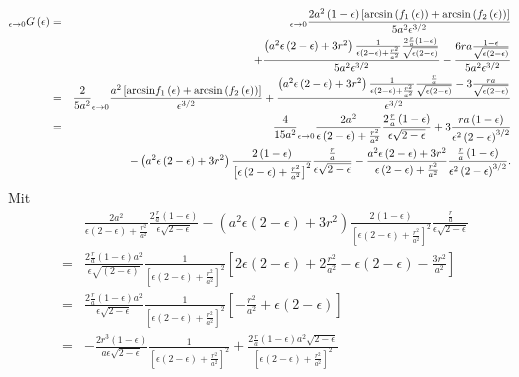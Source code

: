 \documentclass{book}
\renewcommand{\arcsin}{\text{arcsin}}
\let\lim\relax
\DeclareMathOperator*{\lim}{\text{lim}}
\begin{document}
\begin{eqnarray}
\lim_{\epsilon\to 0}G\left(\epsilon\right) & = & \lim_{\epsilon\to 0}\frac{2a^2\left(1 - \epsilon\right)\left[\arcsin\left(f_1\left(\epsilon\right)\right) + \arcsin\left(f_2\left(\epsilon\right)\right)\right]}{5a^2\epsilon^{3/2}}\nonumber\\
&&+ \frac{\left(a^2\epsilon\left(2 - \epsilon\right) + 3r^2\right)\frac{1}{\epsilon\left(2 - \epsilon\right) + \frac{r^2}{a^2}}\frac{2\frac{r}{a}\left(1 - \epsilon\right)}{\sqrt{\epsilon\left(2 - \epsilon\right)}}}{5a^2\epsilon^{3/2}} - \frac{6ra\frac{1 - \epsilon}{\sqrt{\epsilon\left(2 - \epsilon\right)}}}{5a^2\epsilon^{3/2}}\nonumber\\
& = & \frac{2}{5a^2}\lim_{\epsilon\to 0}\frac{a^2\left[\arcsin f_1\left(\epsilon\right) + \arcsin\left(f_2\left(\epsilon\right)\right)\right]}{\epsilon^{3/2}} + \frac{\left(a^2\epsilon\left(2 - \epsilon\right) + 3r^2\right)\frac{1}{\epsilon\left(2 - \epsilon\right) + \frac{r^2}{a^2}}\frac{\frac{r}{a}}{\sqrt{\epsilon\left(2 - \epsilon\right)}} - 3\frac{ra}{\sqrt{\epsilon\left(2 - \epsilon\right)}}}{\epsilon^{3/2}}\nonumber\\
& = & \frac{4}{15a^2}\lim_{\epsilon\to 0}\frac{2a^2}{\epsilon\left(2 - \epsilon\right) + \frac{r^2}{a^2}}\frac{2\frac{r}{a}\left(1 - \epsilon\right)}{\epsilon\sqrt{2 - \epsilon}} + 3\frac{ra\left(1 - \epsilon\right)}{\epsilon^2\left(2 - \epsilon\right)^{3/2}}\nonumber\\
&&- \left(a^2\epsilon\left(2 - \epsilon\right) + 3r^2\right)\frac{2\left(1 - \epsilon\right)}{\left[\epsilon\left(2 - \epsilon\right) + \frac{r^2}{a^2}\right]^2}\frac{\frac{r}{a}}{\epsilon\sqrt{2 - \epsilon}} - \frac{a^2\epsilon\left(2 - \epsilon\right) + 3r^2}{\epsilon\left(2 - \epsilon\right) + \frac{r^2}{a^2}}\frac{\frac{r}{a}\left(1 - \epsilon\right)}{\epsilon^2\left(2 - \epsilon\right)^{3/2}}.
\end{eqnarray}
%
Mit
%
\begin{eqnarray}
&&\frac{2a^2}{\epsilon\left(2 - \epsilon\right) + \frac{r^2}{a^2}}\frac{2\frac{r}{a}\left(1 - \epsilon\right)}{\epsilon\sqrt{2 - \epsilon}} - \left(a^2\epsilon\left(2 - \epsilon\right) + 3r^2\right)\frac{2\left(1 - \epsilon\right)}{\left[\epsilon\left(2 - \epsilon\right) + \frac{r^2}{a^2}\right]^2}\frac{\frac{r}{a}}{\epsilon\sqrt{2 - \epsilon}}\nonumber\\
& = & \frac{2\frac{r}{a}\left(1 - \epsilon\right)a^2}{\epsilon\sqrt{\left(2 - \epsilon\right)}}\frac{1}{\left[\epsilon\left(2 - \epsilon\right) + \frac{r^2}{a^2}\right]^2}\left[2\epsilon\left(2 - \epsilon\right) + 2\frac{r^2}{a^2} - \epsilon\left(2 - \epsilon\right) - \frac{3r^2}{a^2}\right]\nonumber\\
& = & \frac{2\frac{r}{a}\left(1 - \epsilon\right)a^2}{\epsilon\sqrt{2 - \epsilon}}\frac{1}{\left[\epsilon\left(2 - \epsilon\right) + \frac{r^2}{a^2}\right]^2}\left[-\frac{r^2}{a^2} + \epsilon\left(2 - \epsilon\right)\right]\nonumber\\
& = & -\frac{2r^3\left(1 - \epsilon\right)}{a\epsilon\sqrt{2 - \epsilon}}\frac{1}{\left[\epsilon\left(2 - \epsilon\right) + \frac{r^2}{a^2}\right]^2} + \frac{2\frac{r}{a}\left(1 - \epsilon\right)a^2\sqrt{2 - \epsilon}}{\left[\epsilon\left(2 - \epsilon\right) + \frac{r^2}{a^2}\right]^2}
\end{eqnarray}
\end{document}
